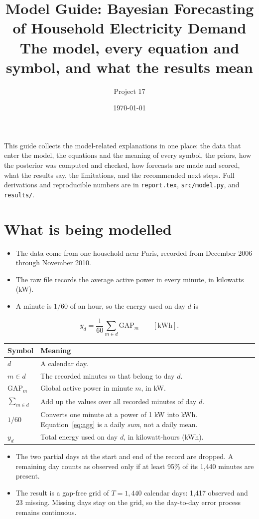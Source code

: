 \documentclass[11pt]{article}
\title{\vspace{-1.2cm}\textbf{Model Guide: Bayesian Forecasting of Household Electricity Demand}\\[2pt]
\large The model, every equation and symbol, and what the results mean}
\author{Project 17}
\date{\today}
\makeatletter
\newcommand{\code}[1]{\texttt{\small #1}}
\newenvironment{reftable}[3]
  {\par\nopagebreak\addvspace{4pt}\noindent
   \renewcommand{\arraystretch}{1.3}%
   \begin{tabular}{@{}>{\raggedright\arraybackslash}p{#1\textwidth}
                      >{\raggedright\arraybackslash}p{\dimexpr0.97\textwidth-#1\textwidth-2\tabcolsep\relax}@{}}
   \toprule \textbf{#2} & \textbf{#3} \\ \midrule}
  {\bottomrule\end{tabular}\par\addvspace{8pt}}
\makeatother
\begin{document}
\maketitle
\thispagestyle{fancy}

\noindent
This guide collects the model-related explanations in one place: the data that
enter the model, the equations and the meaning of every symbol, the priors, how
the posterior was computed and checked, how forecasts are made and scored, what
the results say, the limitations, and the recommended next steps. Full
derivations and reproducible numbers are in \code{report.tex},
\code{src/model.py}, and \code{results/}.

\section{What is being modelled}

\begin{itemize}[leftmargin=*]
\item The data come from one household near Paris, recorded from December 2006
  through November 2010.
\item The raw file records the average active power in every minute, in
  kilowatts (kW).
\item A minute is $1/60$ of an hour, so the energy used on day $d$ is
\end{itemize}
\begin{equation}
y_d = \frac{1}{60}\sum_{m \in d} \mathrm{GAP}_m \qquad [\mathrm{kWh}].
\label{eq:agg}
\end{equation}

\begin{reftable}{0.2}{Symbol}{Meaning}
$d$ & A calendar day. \\
$m \in d$ & The recorded minutes $m$ that belong to day $d$. \\
$\mathrm{GAP}_m$ & Global active power in minute $m$, in kW. \\
$\sum_{m \in d}$ & Add up the values over all recorded minutes of day $d$. \\
$1/60$ & Converts one minute at a power of 1 kW into kWh. Equation~\eqref{eq:agg} is a daily \emph{sum}, not a daily mean. \\
$y_d$ & Total energy used on day $d$, in kilowatt-hours (kWh). \\
\end{reftable}

\begin{itemize}[leftmargin=*]
\item The two partial days at the start and end of the record are dropped. A
  remaining day counts as observed only if at least 95\% of its 1,440 minutes
  are present.
\item The result is a gap-free grid of $T = 1{,}440$ calendar days: 1,417
  observed and 23 missing. Missing days stay on the grid, so the day-to-day
  error process remains continuous.
\end{itemize}
\end{document}
